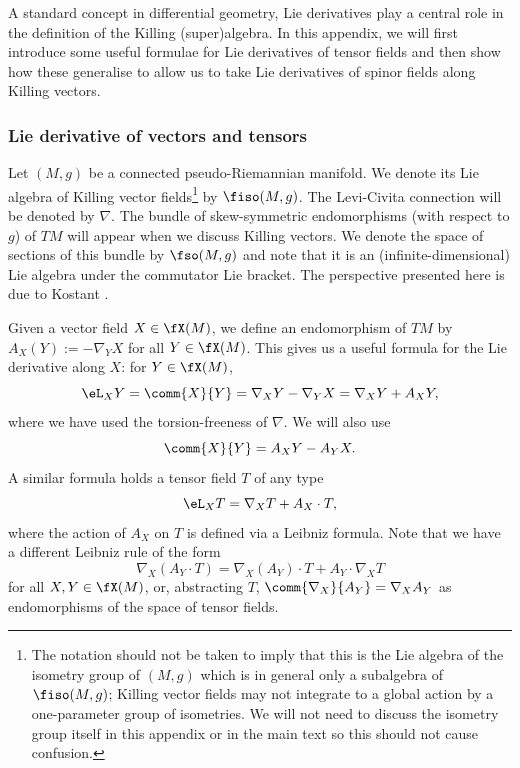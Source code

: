 A standard concept in differential geometry, Lie derivatives play a central role in the definition of the Killing (super)algebra. In this appendix, we will first introduce some useful formulae for Lie derivatives of tensor fields and then show how these generalise to allow us to take Lie derivatives of spinor fields along Killing vectors.

\subsubsection{Lie derivative of vectors and tensors}
\label{sec:lei-der-vector-tensor}

Let $(M,g)$ be a connected pseudo-Riemannian manifold. We denote its Lie algebra of Killing vector fields\footnote{The notation should not be taken to imply that this is the Lie algebra of the isometry group of $(M,g)$ which is in general only a subalgebra of $\fiso(M,g)$; Killing vector fields may not integrate to a global action by a one-parameter group of isometries. We will not need to discuss the isometry group itself in this appendix or in the main text so this should not cause confusion.}
by $\fiso(M,g)$. The Levi-Civita connection will be denoted by $\nabla$. The bundle of skew-symmetric endomorphisms (with respect to $g$) of $TM$ will appear when we discuss Killing vectors. We denote the space of sections of this bundle by $\fso(M,g)$ and note that it is an (infinite-dimensional) Lie algebra under the commutator Lie bracket. The perspective presented here is due to Kostant \cite{Kostant1955}.

Given a vector field $X\in\fX(M)$, we define an endomorphism of $TM$ by
$A_X(Y) := -\nabla_Y X
$
for all $Y\in\fX(M)$. This gives us a useful formula for the Lie derivative along $X$: for $Y\in\fX(M)$,
\begin{equation}\label{eq:lie-der-vec-formula}
	\eL_X Y = \comm{X}{Y} = \nabla_X Y - \nabla_Y X = \nabla_X Y + A_X Y,
\end{equation}
where we have used the torsion-freeness of $\nabla$. We will also use
\begin{equation}\label{eq:comm-formula}
	\comm{X}{Y} = A_X Y - A_Y X.
\end{equation}
A similar formula holds a tensor field $T$ of any type
\begin{equation}\label{eq:lie-der-tensor-formula}
	\eL_X T = \nabla_X T + A_X \cdot T,
\end{equation}
where the action of $A_X$ on $T$ is defined via a Leibniz formula. Note that we have a different Leibniz rule of the form
\[
	\nabla_X (A_Y\cdot T) = \nabla_X(A_Y)\cdot T + A_Y\cdot\nabla_X T
\]
for all $X,Y\in\fX(M)$, or, abstracting $T$, $\comm{\nabla_X}{A_Y}=\nabla_X A_Y$ as endomorphisms of the space of tensor fields.

